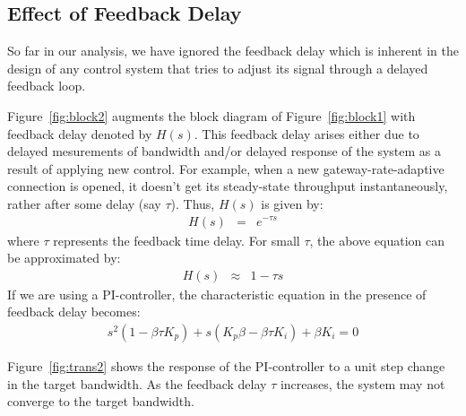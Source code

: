 \documentclass{article}
\begin{document}
\subsection{Effect of Feedback Delay}
So far in our analysis, we have ignored the feedback delay which is
inherent in the design of any control system 
that tries to adjust its signal through
a delayed feedback loop.


Figure~\ref{fig:block2} augments the block diagram
of Figure~\ref{fig:block1}
with feedback delay denoted by $H(s)$. 
This feedback
delay arises either due to delayed
mesurements of bandwidth and/or
delayed response of the system as a result of
applying new control.
For example, when 
a new gateway-rate-adaptive connection is opened, 
it doesn't get its steady-state throughput instantaneously,
rather after some delay (say $\tau$). Thus, $H(s)$ is given by:
\begin{eqnarray*} 
 \label{eqn:hs}    
   H(s) &=& e^{-\tau s}
\end{eqnarray*}
where $\tau$ represents the feedback time delay.
For small $\tau$, the above
equation can be approximated by:
\begin{eqnarray*} 
 \label{eqn:ahs}    
   H(s) &\approx& 1 - \tau s
\end{eqnarray*}
If we are using a PI-controller, the characteristic equation in 
the presence
of feedback delay becomes:
\begin{eqnarray*} 
 \label{eqn:cch}    
    s^2(1-\beta \tau K_p) + s(K_p\beta - \beta \tau K_i) + \beta K_i = 0
\end{eqnarray*}


Figure~\ref{fig:trans2} shows the response
of the PI-controller to a unit step change in the target bandwidth.
As the feedback delay $\tau$ increases,
the system may not converge to the target bandwidth.
\end{document}
